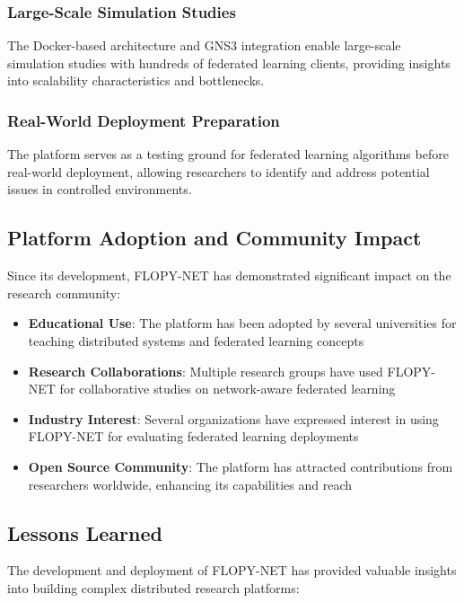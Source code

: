 \subsubsection{Large-Scale Simulation Studies}

The Docker-based architecture and GNS3 integration enable large-scale simulation studies with hundreds of federated learning clients, providing insights into scalability characteristics and bottlenecks.

\subsubsection{Real-World Deployment Preparation}

The platform serves as a testing ground for federated learning algorithms before real-world deployment, allowing researchers to identify and address potential issues in controlled environments.

\subsection{Platform Adoption and Community Impact}

Since its development, FLOPY-NET has demonstrated significant impact on the research community:

\begin{itemize}
    \item \textbf{Educational Use}: The platform has been adopted by several universities for teaching distributed systems and federated learning concepts
    \item \textbf{Research Collaborations}: Multiple research groups have used FLOPY-NET for collaborative studies on network-aware federated learning
    \item \textbf{Industry Interest}: Several organizations have expressed interest in using FLOPY-NET for evaluating federated learning deployments
    \item \textbf{Open Source Community}: The platform has attracted contributions from researchers worldwide, enhancing its capabilities and reach
\end{itemize}

\subsection{Lessons Learned}

The development and deployment of FLOPY-NET has provided valuable insights into building complex distributed research platforms:

